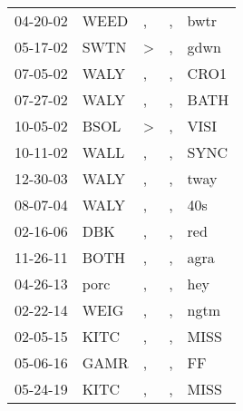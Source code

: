 \begin{supertabular}{lllll}
 04-20-02 &  WEED &             , &  , &  bwtr \\
 05-17-02 &  SWTN &  \textgreater &  , &  gdwn \\
 07-05-02 &  WALY &             , &  , &  CRO1 \\
 07-27-02 &  WALY &             , &  , &  BATH \\
 10-05-02 &  BSOL &  \textgreater &  , &  VISI \\
 10-11-02 &  WALL &             , &  , &  SYNC \\
 12-30-03 &  WALY &             , &  , &  tway \\
 08-07-04 &  WALY &             , &  , &   40s \\
 02-16-06 &   DBK &             , &  , &   red \\
 11-26-11 &  BOTH &             , &  , &  agra \\
 04-26-13 &  porc &             , &  , &   hey \\
 02-22-14 &  WEIG &             , &  , &  ngtm \\
 02-05-15 &  KITC &             , &  , &  MISS \\
 05-06-16 &  GAMR &             , &  , &    FF \\
 05-24-19 &  KITC &             , &  , &  MISS \\
\end{supertabular}
